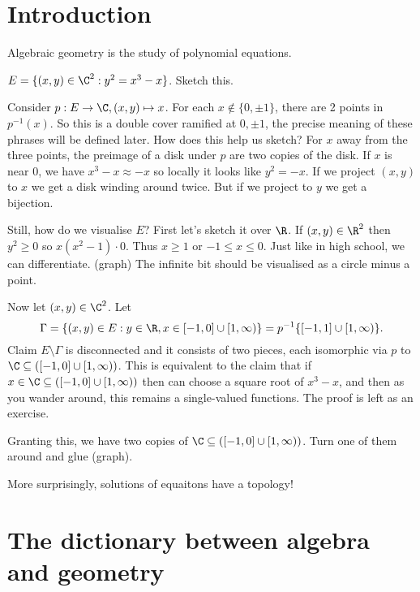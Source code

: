 \documentclass[a4paper]{article}
\begin{document}


\tableofcontents

\setcounter{section}{-1}

\section{Introduction}

Algebraic geometry is the study of polynomial equations.

\begin{eg}
  \(E = \{(x, y) \in \C^2: y^2 = x^3 - x\}\). Sketch this.

  Consider \(p: E \to \C, (x, y) \mapsto x\). For each \(x \notin \{0, \pm 1\}\), there are 2 points in \(p^{-1}(x)\). So this is a double cover ramified at \(0, \pm 1\), the precise meaning of these phrases will be defined later. How does this help us sketch? For \(x\) away from the three points, the preimage of a disk under \(p\) are two copies of the disk. If \(x\) is near \(0\), we have \(x^3 - x \approx -x\) so locally it looks like \(y^2 = -x\). If we project \((x, y)\) to \(x\) we get a disk winding around twice. But if we project to \(y\) we get a bijection.

  Still, how do we visualise \(E\)? First let's sketch it over \(\R\). If \((x, y) \in \R^2\) then \(y^2 \geq 0\) so \(x(x^2 - 1) \cdot 0\). Thus \(x \geq 1\) or \(-1 \leq x \leq 0\). Just like in high school, we can differentiate. (graph) The infinite bit should be visualised as a circle minus a point.

  Now let \((x, y) \in \C^2\). Let
  \[
    \Gamma = \{(x, y) \in E: y \in \R, x \in [-1, 0] \cup [1, \infty)\} = p^{-1}\{[-1, 1] \cup [1, \infty)\}.
  \]
  Claim \(E \setminus \Gamma\) is disconnected and it consists of two pieces, each isomorphic via \(p\) to \(\C \subseteq ([-1, 0] \cup [1, \infty))\). This is equivalent to the claim that if \(x \in \C \subseteq ([-1, 0] \cup [1, \infty))\) then can choose a square root of \(x^3 - x\), and then as you wander around, this remains a single-valued functions. The proof is left as an exercise.

  Granting this, we have two copies of \(\C \subseteq ([-1, 0] \cup [1, \infty))\). Turn one of them around and glue (graph).

  More surprisingly, solutions of equaitons have a topology!
\end{eg}

\section{The dictionary between algebra and geometry}
\end{document}
